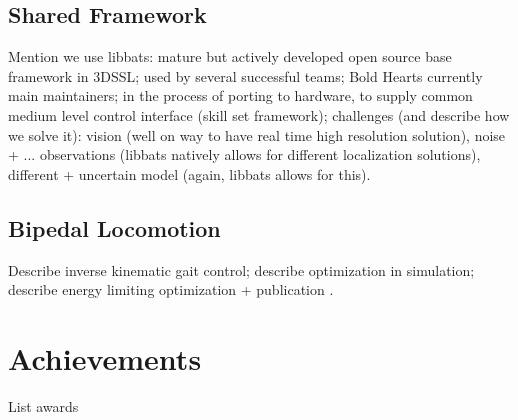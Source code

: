 \documentclass{llncs}
\begin{document}
\subsection{Shared Framework}
\label{sec:framework}

Mention we use libbats: mature but actively developed open source base
framework in 3DSSL; used by several successful teams; Bold Hearts
currently main maintainers; in the process of porting to hardware, to
supply common medium level control interface (skill set framework);
challenges (and describe how we solve it): vision (well on way to have
real time high resolution solution), noise + ... observations (libbats
natively allows for different localization solutions), different +
uncertain model (again, libbats allows for this).

\subsection{Bipedal Locomotion}
\label{sec:bipedal-locomotion}

Describe inverse kinematic gait control; describe optimization in
simulation; describe energy limiting optimization + publication
\cite{lattarulo_application_2011}.

\section{Achievements}
\label{sec:achievements}

List awards



\end{document}
